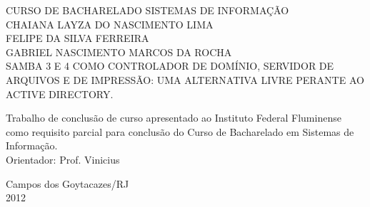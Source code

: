 \begin{titlepage}
 \begin{figure}[ht]
 \centering
 \end{figure}
 \begin{center}
   	{\large CURSO DE BACHARELADO SISTEMAS DE INFORMAÇÃO} \\ [3.5cm]
	{\large CHAIANA LAYZA DO NASCIMENTO LIMA} \\
	{\large FELIPE DA SILVA FERREIRA} \\	
	{\large GABRIEL NASCIMENTO MARCOS DA ROCHA} \\ [4cm]
   	{\large SAMBA 3 E 4 COMO CONTROLADOR DE DOMÍNIO, SERVIDOR DE ARQUIVOS E DE 	IMPRESSÃO: UMA ALTERNATIVA LIVRE PERANTE AO ACTIVE DIRECTORY.}\\ [2cm]
   \hspace{.45\textwidth} %
   \begin{minipage}{0.5\textwidth}
   \begin{espacosimples}
        Trabalho de conclusão de curso apresentado ao Instituto Federal Fluminense como requisito parcial para conclusão do Curso de Bacharelado em Sistemas de Informação.\\[1.5cm]
        Orientador: Prof. Vinicius
    \end{espacosimples}
    \end{minipage}
   \vfill
   {\large Campos dos Goytacazes/RJ} \\
   {\large 2012}
 \end{center}
\end{titlepage}
